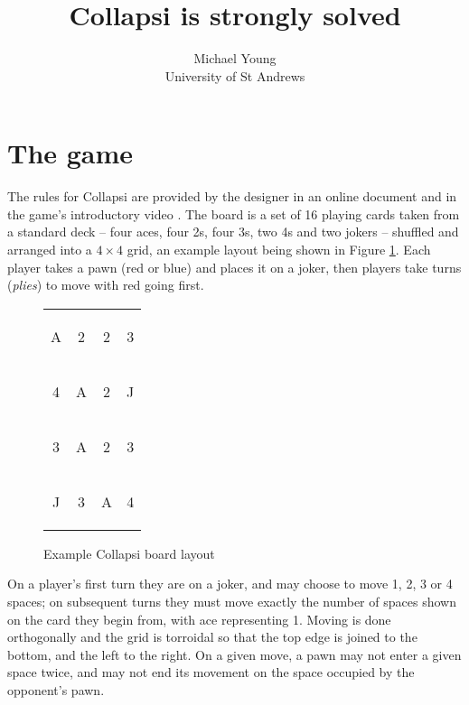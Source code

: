 \documentclass[a4paper, twocolumn]{article}
\title{Collapsi is strongly solved}
\author{Michael Young\\University of St Andrews}
\newcommand\card[1]{\begin{tcolorbox}#1\end{tcolorbox}}
\newcommand\board[8]{
  \setlength{\tabcolsep}{0.1cm}
  \begin{tabular}{c c c c}
    \card{#1} & \card{#2} & \card{#3} & \card{#4} \\
    \card{#5} & \card{#6} & \card{#7} & \card{#8} \\
    \boardmore
}
\newcommand\boardmore[8]{
    \card{#1} & \card{#2} & \card{#3} & \card{#4} \\
    \card{#5} & \card{#6} & \card{#7} & \card{#8}
  \end{tabular}
}
\begin{document}
\maketitle



\section{The game}

The rules for Collapsi are provided by the designer in an online document
\cite{rules} and in the game's introductory video \cite{youtube}. The
board is a set of 16 playing cards taken from a standard deck -- four aces, four
2s, four 3s, two 4s and two jokers -- shuffled and arranged into a $4\times 4$
grid, an example layout being shown in Figure \ref{fig:board}. Each player takes
a pawn (red or blue) and places it on a joker, then players take turns
(\textit{plies}) to move with red going first.

\begin{figure}[ht]
  \centering
  \board A223 4A2J 3A23 J3A4
  \caption{Example Collapsi board layout}
  \label{fig:board}
\end{figure}

On a player's first turn they are on a joker, and may choose to move 1, 2, 3 or 4 spaces; on
subsequent turns they must move exactly the number of spaces shown on the card
they begin from, with ace representing 1. Moving is done orthogonally and the
grid is torroidal so that the top edge is joined to the bottom, and the left to
the right. On a given move, a pawn may not enter a given space twice, and may
not end its movement on the space occupied by the opponent's pawn.
\end{document}
